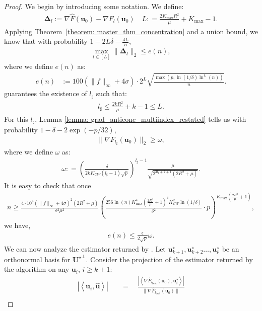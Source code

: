 \documentclass[final,12pt]{colt2018} %
\renewcommand\v[1]{{\ensuremath{\boldsymbol{#1}}}}
\newcommand\ip[1]{\left\langle #1 \right\rangle}
\begin{document}
\begin{proof}
We begin by introducing some notation. We define: 
\begin{align*}
    \v \Delta_l := \nabla \hat{F}(\v u_0) - \nabla F_l(\v u_0) \quad L : = \frac{2K_{\text{max}} R^2}{\mu} + K_{\text{max}} - 1.
\end{align*}
Applying  Theorem~\ref{theorem: master_thm_concentration} and a union bound, we know that with probability $1-2L \delta - \frac{4L}{n}$, 
\begin{align*}
    \max_{l \in [L]} \| \v \Delta_l \|_2 \leq e(n),
\end{align*}
where we define $e(n)$ as:
\begin{align*}
e(n) & := 100(\|f\|_\infty+ 4\sigma) \cdot 2^L \sqrt{\frac{\max \left(p, \ln(1/\delta) \ln^L(n) \right)}{n}}.    
\end{align*}
 guarantees the existence of $l_\sharp$ such that: 
\begin{align*}
    l_\sharp \leq \frac{2k R^2}{\mu} + k - 1 \leq L.
\end{align*}
For this $l_\sharp$, Lemma \ref{lemma: grad_anticonc_multiindex_restated} tells us with probability $1-\delta - 2\exp(-p/32)$,
\begin{align*}
    \| \nabla{F_{l_\sharp}} (\v u_0) \|_2 \geq \omega,
\end{align*}
where we define $\omega$ as: 
\begin{align*}
    \omega: = \left( \frac{\delta}{2kK_{CW}(l_\sharp-1)\sqrt{p}} \right)^{l_\sharp-1} \frac{\mu}{\sqrt{2^{3l_\sharp+k+1}(2R^2+\mu)}}. 
\end{align*}
It is easy to check that once
\begin{align*}
    n \geq \frac{4\cdot 10^4(\|f\|_\infty + 4\sigma)^2 (2R^2 + \mu)}{\epsilon^2 \mu^2} \left( \frac{256 \ln(n)K_\text{max}^4\left( \frac{2R^2}{\mu} + 1\right)^4K_{CW}^2 \ln(1/\delta)}{\delta^2} \cdot p  \right)^{K_\text{max}\left(\frac{2R^2}{\mu}+1\right)},
\end{align*}
we have, 
\begin{align*}
    e(n) \leq \frac{\epsilon}{2\sqrt{p}} \omega.
\end{align*}
We can now analyze the estimator returned by . Let $\v u_{k+1}^\star, \v u_{k+2}^\star \dotsc, \v u_p^\star$ be an orthonormal basis for ${\mathcal{\v U}^\star}^\perp$. Consider the projection of the estimator returned by the algorithm on any $\v u_i$, $i \geq k+1$: 
\begin{align}
    |\ip{\v u_i, \hat{\v u}}| & \quad = \quad \frac{\left|\ip{\nabla \hat{F}_{l_\text{best}}(\v u_0),\v u_i^\star}\right|}{\| \nabla \hat{F}_{l_\text{best}}(\v u_0)\|} \nonumber \\

\end{align}
\end{proof}
\end{document}
